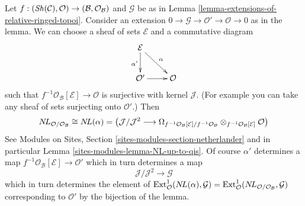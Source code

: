 \begin{remark}
\label{remark-extensions-of-relative-ringed-topoi}
Let $f : (\mathop{\mathit{Sh}}\nolimits(\mathcal{C}), \mathcal{O}) \to
(\mathcal{B}, \mathcal{O}_\mathcal{B})$ and $\mathcal{G}$
be as in Lemma \ref{lemma-extensions-of-relative-ringed-topoi}.
Consider an extension
$0 \to \mathcal{G} \to \mathcal{O}' \to \mathcal{O} \to 0$
as in the lemma. We can choose a sheaf of sets $\mathcal{E}$
and a commutative diagram
$$
\xymatrix{
\mathcal{E} \ar[d]_{\alpha'} \ar[rd]^\alpha \\
\mathcal{O}' \ar[r] & \mathcal{O}
}
$$
such that $f^{-1}\mathcal{O}_\mathcal{B}[\mathcal{E}] \to \mathcal{O}$
is surjective with kernel $\mathcal{J}$.
(For example you can take any sheaf of sets surjecting
onto $\mathcal{O}'$.) Then
$$
\mathop{N\!L}\nolimits_{\mathcal{O}/\mathcal{O}_\mathcal{B}} \cong \mathop{N\!L}\nolimits(\alpha) = 
\left(
\mathcal{J}/\mathcal{J}^2
\longrightarrow
\Omega_{f^{-1}\mathcal{O}_\mathcal{B}[\mathcal{E}]/
f^{-1}\mathcal{O}_\mathcal{B}}
\otimes_{f^{-1}\mathcal{O}_\mathcal{B}[\mathcal{E}]} \mathcal{O}\right)
$$
See Modules on Sites, Section \ref{sites-modules-section-netherlander}
and in particular Lemma \ref{sites-modules-lemma-NL-up-to-qis}.
Of course $\alpha'$ determines a map
$f^{-1}\mathcal{O}_\mathcal{B}[\mathcal{E}] \to \mathcal{O}'$
which in turn determines a map
$$
\mathcal{J}/\mathcal{J}^2 \longrightarrow \mathcal{G}
$$
which in turn determines the element of
$\mathop{\mathrm{Ext}}\nolimits^1_\mathcal{O}(\mathop{N\!L}\nolimits(\alpha), \mathcal{G}) =
\mathop{\mathrm{Ext}}\nolimits^1_\mathcal{O}(\mathop{N\!L}\nolimits_{\mathcal{O}/\mathcal{O}_\mathcal{B}}, \mathcal{G})$
corresponding to $\mathcal{O}'$ by the bijection of the lemma.
\end{remark}

